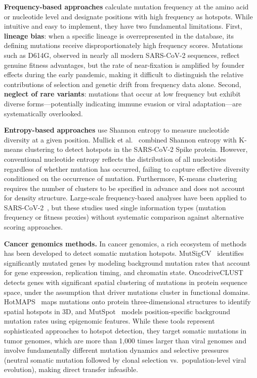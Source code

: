 \textbf{Frequency-based approaches} calculate mutation frequency at the amino acid or nucleotide level and designate positions with high frequency as hotspots.
While intuitive and easy to implement, they have two fundamental limitations.
First, \textbf{lineage bias}: when a specific lineage is overrepresented in the database, its defining mutations receive disproportionately high frequency scores.
Mutations such as D614G, observed in nearly all modern SARS-CoV-2 sequences, reflect genuine fitness advantages, but the rate of near-fixation is amplified by founder effects during the early pandemic, making it difficult to distinguish the relative contributions of selection and genetic drift from frequency data alone.
Second, \textbf{neglect of rare variants}: mutations that occur at low frequency but exhibit diverse forms---potentially indicating immune evasion or viral adaptation---are systematically overlooked.

\textbf{Entropy-based approaches} use Shannon entropy to measure nucleotide diversity at a given position.
Mullick et al.~\cite{mullick2021entropy} combined Shannon entropy with K-means clustering to detect hotspots in the SARS-CoV-2 Spike protein.
However, conventional nucleotide entropy reflects the distribution of all nucleotides regardless of whether mutation has occurred, failing to capture effective diversity conditioned on the occurrence of mutation.
Furthermore, K-means clustering requires the number of clusters to be specified in advance and does not account for density structure.
Large-scale frequency-based analyses have been applied to SARS-CoV-2~\cite{koyama2020variant,obermeyer2022analysis}, but these studies used single information types (mutation frequency or fitness proxies) without systematic comparison against alternative scoring approaches.

\textbf{Cancer genomics methods.}
In cancer genomics, a rich ecosystem of methods has been developed to detect somatic mutation hotspots.
MutSigCV~\cite{lawrence2013mutsigcv} identifies significantly mutated genes by modeling background mutation rates that account for gene expression, replication timing, and chromatin state.
OncodriveCLUST~\cite{tamborero2013oncodriveclust} detects genes with significant spatial clustering of mutations in protein sequence space, under the assumption that driver mutations cluster in functional domains.
HotMAPS~\cite{tokheim2016hotmaps} maps mutations onto protein three-dimensional structures to identify spatial hotspots in 3D, and MutSpot~\cite{munoz2020mutspot} models position-specific background mutation rates using epigenomic features.
While these tools represent sophisticated approaches to hotspot detection, they target somatic mutations in tumor genomes, which are more than 1,000 times larger than viral genomes and involve fundamentally different mutation dynamics and selective pressures (neutral somatic mutation followed by clonal selection vs.\ population-level viral evolution), making direct transfer infeasible.

